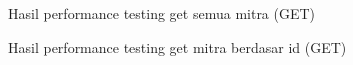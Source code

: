 \begin{figure}[H]
  {\par}
  \caption{Hasil performance testing get semua mitra (GET)}
  \label{mitra-testing}
\end{figure}

\begin{figure}[H]
  {\par}
  \caption{Hasil performance testing get mitra berdasar id (GET)}
  \label{mitra-id-testing}
\end{figure}

